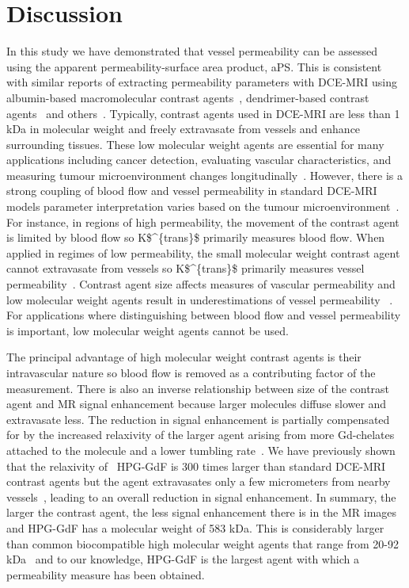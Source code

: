 \section{Discussion}

In this study we have demonstrated that vessel permeability can be assessed using the apparent permeability-surface area product, \acs{aPS}.
This is consistent with similar reports of extracting permeability parameters with \acs{DCE-MRI} using albumin-based macromolecular contrast agents~\cite{DaldrupLink:2004gy,Turetschek:2001wu}, dendrimer-based contrast agents~\cite{deLussanet:2005cb} and others~\cite{Turetschek:2004bw}.
Typically, contrast agents used in \acs{DCE-MRI} are less than 1 kDa in molecular weight and freely extravasate from vessels and enhance surrounding tissues.
These low molecular weight agents are essential for many applications including cancer detection,  evaluating vascular characteristics, and measuring tumour microenvironment changes longitudinally~\cite{Padhani:2002cj}.
However, there is a strong coupling of blood flow and vessel permeability in standard \acs{DCE-MRI} models parameter interpretation varies based on the tumour microenvironment~\cite{Gerstner:2008ba}.
For instance, in regions of high permeability, the movement of the contrast agent is limited by blood flow so \acs{K$^{trans}$} primarily measures blood flow.
When applied in regimes of low permeability, the small molecular weight contrast agent cannot extravasate from vessels so \acs{K$^{trans}$} primarily measures vessel permeability~\cite{Tofts:1999we}.
Contrast agent size affects measures of vascular permeability and low molecular weight agents result in underestimations of vessel permeability ~\cite{deLussanet:2005cb}.
For applications where distinguishing between blood flow and vessel permeability is important, low molecular weight agents cannot be used.

The principal advantage of high molecular weight contrast agents is their intravascular nature so blood flow is removed as a contributing factor of the measurement.
There is also an inverse relationship between size of the contrast agent and MR signal enhancement because larger molecules diffuse slower and extravasate less.
The reduction in signal enhancement is partially compensated for by the increased relaxivity of the larger agent arising from more Gd-chelates attached to the molecule and a lower tumbling rate~\cite{Barrett:2006jx}.
We have previously shown that the relaxivity of ~\acs{HPG-GdF} is 300 times larger than standard \acs{DCE-MRI} contrast agents but the agent extravasates only a few micrometers from nearby vessels~\cite{Baker:2015coa}, leading to an overall reduction in signal enhancement.
In summary, the larger the contrast agent, the less signal enhancement there is in the MR images and \acs{HPG-GdF} has a molecular weight of 583 kDa.
This is considerably larger than common biocompatible high molecular weight agents that range from 20-92 kDa~\cite{Barrett:2006jx} and to our knowledge, \acs{HPG-GdF} is the largest agent with which a permeability measure has been obtained.

